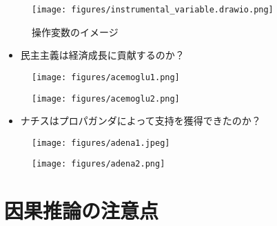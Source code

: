 \documentclass[
  xelatex,
  ja=standard]{bxjsarticle}
\providecommand{\tightlist}{%
  \setlength{\itemsep}{0pt}\setlength{\parskip}{0pt}}\usepackage{longtable,booktabs,array}
\begin{document}
\begin{figure}[htpb]

{\centering \texttt{[image: figures/instrumental\_variable.drawio.png]}

}

\caption{操作変数のイメージ}

\end{figure}

\begin{itemize}
\tightlist
\item
  民主主義は経済成長に貢献するのか？
\end{itemize}

\begin{figure}[htpb]

{\centering \texttt{[image: figures/acemoglu1.png]}

}

\caption{\citet{acemoglu2001}}

\end{figure}

\begin{figure}[htpb]

{\centering \texttt{[image: figures/acemoglu2.png]}

}

\caption{\citet{acemoglu2001}}

\end{figure}

\begin{itemize}
\tightlist
\item
  ナチスはプロパガンダによって支持を獲得できたのか？
\end{itemize}

\begin{figure}[htpb]

{\centering \texttt{[image: figures/adena1.jpeg]}

}

\caption{\citet{adena2015}}

\end{figure}

\begin{figure}[htpb]

{\centering \texttt{[image: figures/adena2.png]}

}

\caption{\citet{adena2015}}

\end{figure}

\hypertarget{ux56e0ux679cux63a8ux8ad6ux306eux6ce8ux610fux70b9}{%
\section{因果推論の注意点}\label{ux56e0ux679cux63a8ux8ad6ux306eux6ce8ux610fux70b9}}
\end{document}
